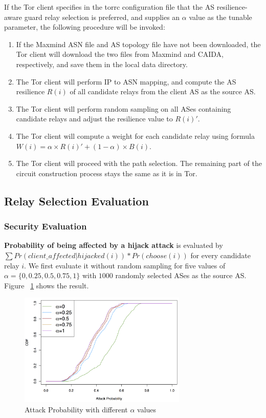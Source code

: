 If the Tor client specifies in the torrc configuration file that the AS resilience-aware guard relay selection is preferred, and supplies an $\alpha$ value as the tunable parameter, the following procedure will be invoked:

\begin{enumerate}
\item If the Maxmind ASN file and AS topology file have not been downloaded, the Tor client will download the two files from Maxmind and CAIDA, respectively, and save them in the local data directory. 
\item The Tor client will perform IP to ASN mapping, and compute the AS resilience $R(i)$ of all candidate relays from the client AS as the source AS. 
\item The Tor client will perform random sampling on all ASes containing candidate relays and adjust the resilience value to $R(i)\prime$.
\item The Tor client will compute a weight for each candidate relay using formula $W(i) = \alpha \times R(i) \prime + (1 - \alpha) \times B(i)$. 
\item The Tor client will proceed with the path selection. The remaining part of the circuit construction process stays the same as it is in Tor. 
\end{enumerate}

\subsection{Relay Selection Evaluation}

\subsubsection{Security Evaluation}

\textbf{Probability of being affected by a hijack attack} is evaluated by
 $\sum Pr(client\_affected | hijacked(i)) * Pr(choose(i))$ for every candidate relay $i$. We first evaluate it without random sampling for five values of $\alpha=\{0, 0.25, 0.5, 0.75, 1\}$ with $1000$ randomly selected ASes as the source AS. Figure ~\ref{fig_attack} shows the result. 

\begin{figure}[ht!]
\centering
\includegraphics[width=80mm]{figure/attack}
\caption{Attack Probability with different $\alpha$ values \label{fig_attack}}
\end{figure}


